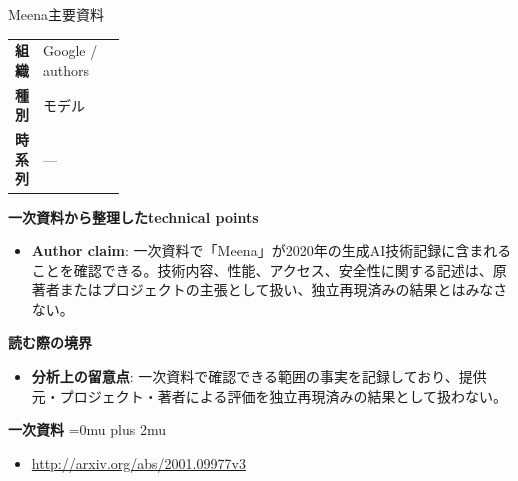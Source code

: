 \begin{technicalnote}{Meena}{主要資料}
\begingroup
\begin{tabularx}{\linewidth}{@{}>{\bfseries}p{0.22\linewidth}X@{}}
組織 & Google / authors \\
種別 & モデル \\
時系列 & — \\
\end{tabularx}
\smallskip
{\bfseries 一次資料から整理したtechnical points}
\begin{itemize}[leftmargin=1.5em,itemsep=0.35em]
\item \textbf{Author claim}: 一次資料で「Meena」が2020年の生成AI技術記録に含まれることを確認できる。技術内容、性能、アクセス、安全性に関する記述は、原著者またはプロジェクトの主張として扱い、独立再現済みの結果とはみなさない。
\end{itemize}
\begin{minipage}{\linewidth}
{\bfseries 読む際の境界}
\begin{itemize}[leftmargin=1.5em,itemsep=0.35em]
\item \textbf{分析上の留意点}: 一次資料で確認できる範囲の事実を記録しており、提供元・プロジェクト・著者による評価を独立再現済みの結果として扱わない。
\end{itemize}
\begin{samepage}
{\bfseries 一次資料}
\begingroup\sloppy
\Urlmuskip=0mu plus 2mu\relax
\begin{itemize}[leftmargin=1.5em,itemsep=0.25em]
\item {\scriptsize\url{http://arxiv.org/abs/2001.09977v3}}
\end{itemize}
\endgroup
\end{samepage}
\end{minipage}
\endgroup
\end{technicalnote}
\medskip

